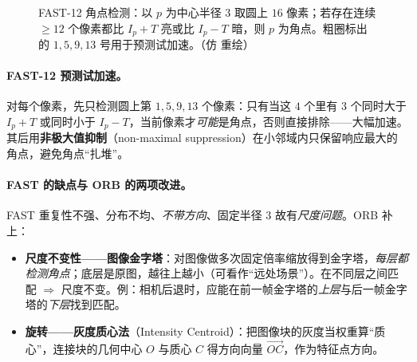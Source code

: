 \begin{figure}[ht]
\centering
{}
\caption{FAST-12 角点检测：以 $p$ 为中心半径 $3$ 取圆上 $16$ 像素；若存在连续 $\ge 12$ 个像素都比 $I_p+T$ 亮或比 $I_p-T$ 暗，则 $p$ 为角点。粗圈标出的 $1,5,9,13$ 号用于预测试加速。（仿\cite{gaoxiang2019slam14} 重绘）}
\label{fig:vo-fast}
\end{figure}

\paragraph{FAST-12 预测试加速\cite{gaoxiang2019slam14}。}对每个像素，先只检测圆上第 $1,5,9,13$ 个像素：只有当这 $4$ 个里有 $3$ 个同时大于 $I_p+T$ 或同时小于 $I_p-T$，当前像素才\emph{可能}是角点，否则直接排除——大幅加速。其后用\textbf{非极大值抑制}（non-maximal suppression）在小邻域内只保留响应最大的角点，避免角点“扎堆”。

\paragraph{FAST 的缺点与 ORB 的两项改进\cite{gaoxiang2019slam14}。}FAST 重复性不强、分布不均、\emph{不带方向}、固定半径 $3$ 故有\emph{尺度问题}。ORB 补上：
\begin{itemize}
  \item \textbf{尺度不变性——图像金字塔}：对图像做多次固定倍率缩放得到金字塔，\emph{每层都检测角点}；底层是原图，越往上越小（可看作“远处场景”）。在不同层之间匹配 $\Rightarrow$ 尺度不变。例：相机后退时，应能在前一帧金字塔的\emph{上层}与后一帧金字塔的\emph{下层}找到匹配。
  \item \textbf{旋转——灰度质心法}（Intensity Centroid）：把图像块的灰度当权重算“质心”，连接块的几何中心 $O$ 与质心 $C$ 得方向向量 $\overrightarrow{OC}$，作为特征点方向。
\end{itemize}

